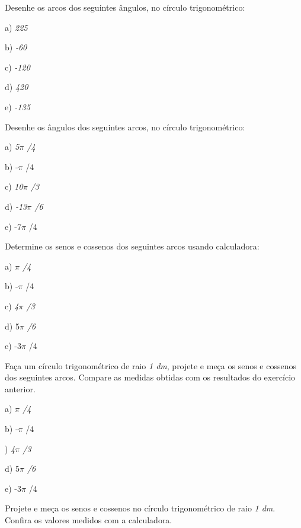 \begin{exercicios}
\item Desenhe os arcos dos seguintes ângulos, no círculo trigonométrico:

a) \textit{225\degree}

b) \textit{-60\degree }

c) \textit{-120\degree}

d) \textit{420\degree}

e) \textit{-135\degree}

\item Desenhe os ângulos dos seguintes arcos, no círculo trigonométrico:

a) \textit{5$ \pi $ /4}

b) -$ \pi $ /4

c) \textit{10$ \pi $ /3}

d) \textit{-13$ \pi $ /6}

e) -7$ \pi $ /4

\item Determine os senos e cossenos dos seguintes arcos usando calculadora:

a) \textit{ $ \pi $ /4}

b) -$ \pi $ /4

c) \textit{4$ \pi $ /3}

d) 5\textit{$ \pi $ /6\tab }

e) -3$ \pi $ /4

\item Faça um círculo trigonométrico de raio \textit{1 dm}, projete e meça os senos e cossenos dos seguintes arcos. Compare as medidas obtidas com os resultados do exercício anterior.

a) \textit{$ \pi $ /4}

b) -$ \pi $ /4

) \textit{4$ \pi $ /3}

d) 5\textit{$ \pi $ /6}

e) -3$ \pi $ /4

\item Projete e meça os senos e cossenos no círculo trigonométrico de raio \textit{1 dm}. Confira os valores medidos com a calculadora.


\end{exercicios}
